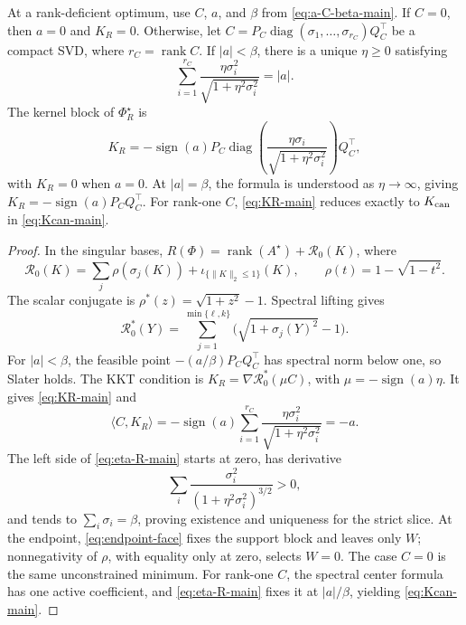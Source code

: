 \begin{theorem}
\label{thm:general-fenchel-center}
At a rank-deficient optimum, use \(C\), \(a\), and \(\beta\) from
\eqref{eq:a-C-beta-main}.  If \(C=0\), then \(a=0\) and \(K_R=0\).
Otherwise, let
\(C=P_C\operatorname{diag}(\sigma_1,\ldots,\sigma_{r_C})Q_C^\top\) be a compact
SVD, where \(r_C=\operatorname{rank}C\).  If \(|a|<\beta\), there is a unique
\(\eta\ge0\) satisfying
\begin{equation}
 \sum_{i=1}^{r_C}
 \frac{\eta\sigma_i^2}{\sqrt{1+\eta^2\sigma_i^2}}=|a|.
 \label{eq:eta-R-main}
\end{equation}
The kernel block of \(\Phi_R^\star\) is
\begin{equation}
 K_R=-\operatorname{sign}(a)P_C
 \operatorname{diag}\left(
  \frac{\eta\sigma_i}{\sqrt{1+\eta^2\sigma_i^2}}
 \right)Q_C^\top,
 \label{eq:KR-main}
\end{equation}
with \(K_R=0\) when \(a=0\).  At \(|a|=\beta\), the formula is understood as
\(\eta\to\infty\), giving
\(K_R=-\operatorname{sign}(a)P_CQ_C^\top\).  For rank-one \(C\),
\eqref{eq:KR-main} reduces exactly to
\(K_{\rm can}\) in \eqref{eq:Kcan-main}.
\end{theorem}

\begin{proof}
In the singular bases,
\(R(\Phi)=\operatorname{rank}(A^\star)+\mathcal R_0(K)\), where
\[
 \mathcal R_0(K)=\sum_j\rho(\sigma_j(K))
 +\iota_{\{\|K\|_2\le1\}}(K),
 \qquad \rho(t)=1-\sqrt{1-t^2}.
\]
The scalar conjugate is \(\rho^*(z)=\sqrt{1+z^2}-1\).  Spectral lifting gives
\[
 \mathcal R_0^*(Y)=
 \sum_{j=1}^{\min\{\ell,k\}}
 \bigl(\sqrt{1+\sigma_j(Y)^2}-1\bigr).
\]
For \(|a|<\beta\), the feasible point
\(-(a/\beta)P_CQ_C^\top\) has spectral norm below one, so Slater holds.  The
KKT condition is
\(K_R=\nabla\mathcal R_0^*(\mu C)\), with
\(\mu=-\operatorname{sign}(a)\eta\).  It gives \eqref{eq:KR-main} and
\[
 \langle C,K_R\rangle
 =-\operatorname{sign}(a)\sum_{i=1}^{r_C}
 \frac{\eta\sigma_i^2}{\sqrt{1+\eta^2\sigma_i^2}}=-a.
\]
The left side
of \eqref{eq:eta-R-main} starts at zero, has derivative
\[
 \sum_i\frac{\sigma_i^2}{(1+\eta^2\sigma_i^2)^{3/2}}>0,
\]
and tends to \(\sum_i\sigma_i=\beta\), proving existence and uniqueness for
the strict slice.  At the endpoint, \eqref{eq:endpoint-face} fixes the support
block and leaves only \(W\); nonnegativity of \(\rho\), with equality only at
zero, selects \(W=0\).  The case \(C=0\) is the same unconstrained minimum.
For rank-one \(C\), the spectral center formula has one active coefficient,
and \eqref{eq:eta-R-main} fixes it at \(|a|/\beta\), yielding
\eqref{eq:Kcan-main}.
\end{proof}

